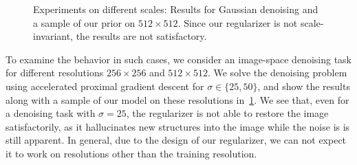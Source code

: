\documentclass[../ml-ct.tex]{subfiles}
\begin{document}
\begin{figure}
	\caption[Demonstration of scale-non-invariance of our regularizer.]{%
		Experiments on different scales:
		Results for Gaussian denoising and a sample of our prior on \( \num{512} \times \num{512} \).
		Since our regularizer is not scale-invariant, the results are not satisfactory.
	}%
	\label{fig:experiments:scale-denoising}
\end{figure}

To examine the behavior in such cases, we consider an image-space denoising task for different resolutions \( \num{256} \times \num{256} \) and \( \num{512} \times \num{512} \).
We solve the denoising problem using accelerated proximal gradient descent for \( \sigma \in \{ 25, 50 \} \), and show the results along with a sample of our model on these resolutions in~\cref{fig:experiments:scale-denoising}.
We see that, even for a denoising task with \( \sigma = \num{25} \), the regularizer is not able to restore the image satisfactorily, as it hallucinates new structures into the image while the noise is is still apparent.
In general, due to the design of our regularizer, we can not expect it to work on resolutions other than the training resolution.
\end{document}
